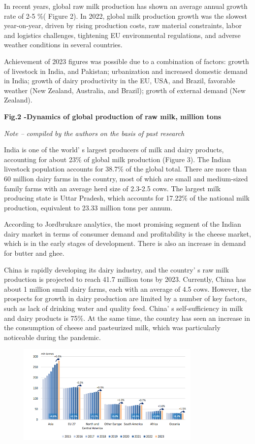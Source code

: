 In recent years, global raw milk production has shown an average annual
growth rate of 2-5 \%( Figure 2). In 2022, global milk production growth
was the slowest year-on-year, driven by rising production costs, raw
material constraints, labor and logistics challenges, tightening EU
environmental regulations, and adverse weather conditions in several
countries.

Achievement of 2023 figures was possible due to a combination of
factors: growth of livestock in India, and Pakistan; urbanization and
increased domestic demand in India; growth of dairy productivity in the
EU, USA, and Brazil, favorable weather (New Zealand, Australia, and
Brazil); growth of external demand (New Zealand).

{\bfseries Fig.2 -Dynamics of global production of raw milk, million tons}

\emph{Note -- compiled by the authors on the basis of past research}

India is one of the world' s largest producers of milk
and dairy products, accounting for about 23\% of global milk production
(Figure 3). The Indian livestock population accounts for 38.7\% of the
global total. There are more than 60 million dairy farms in the country,
most of which are small and medium-sized family farms with an average
herd size of 2.3-2.5 cows. The largest milk producing state is Uttar
Pradesh, which accounts for 17.22\% of the national milk production,
equivalent to 23.33 million tons per annum.

According to Jordbrukare analytics, the most promising segment of the
Indian dairy market in terms of consumer demand and profitability is the
cheese market, which is in the early stages of development. There is
also an increase in demand for butter and ghee.

China is rapidly developing its dairy industry, and the
country' s raw milk production is projected to reach 41.7
million tons by 2023. Currently, China has about 1 million small dairy
farms, each with an average of 4.5 cows. However, the prospects for
growth in dairy production are limited by a number of key factors, such
as lack of drinking water and quality feed. China' s
self-sufficiency in milk and dairy products is 75\%. At the same time,
the country has seen an increase in the consumption of cheese and
pasteurized milk, which was particularly noticeable during the pandemic.


\begin{figure}[H]
	\centering
	\includegraphics[width=0.8\textwidth]{media/ekon/image2}
	\caption*{}
\end{figure}


